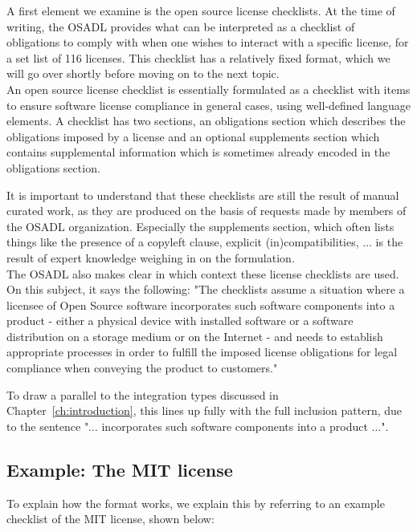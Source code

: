A first element we examine is the open source license checklists. At the time of writing, the OSADL provides what can be interpreted as a checklist of obligations to comply with when one wishes to interact with a specific license, for a set list of 116 licenses. This checklist has a relatively fixed format, which we will go over shortly before moving on to the next topic. \\

An open source license checklist is essentially formulated as a checklist with items to ensure software license compliance in general cases, using well-defined language elements. A checklist has two sections, an obligations section which describes the obligations imposed by a license and an optional supplements section which contains supplemental information which is sometimes already encoded in the obligations section.

It is important to understand that these checklists are still the result of manual curated work, as they are produced on the basis of requests made by members of the OSADL organization. Especially the supplements section, which often lists things like the presence of a copyleft clause, explicit (in)compatibilities, ... is the result of expert knowledge weighing in on the formulation. \\

The OSADL also makes clear in which context these license checklists are used. On this subject, it says the following: "The checklists assume a situation where a licensee of Open Source software incorporates such software components into a product - either a physical device with installed software or a software distribution on a storage medium or on the Internet - and needs to establish appropriate processes in order to fulfill the imposed license obligations for legal compliance when conveying the product to customers."~\cite{osadl-license-checklists-scope}

To draw a parallel to the integration types discussed in Chapter~\ref{ch:introduction}, this lines up fully with the full inclusion pattern, due to the sentence "... incorporates such software components into a product ...".

\subsection{Example: The MIT license}

To explain how the format works, we explain this by referring to an example checklist of the MIT license, shown below:

